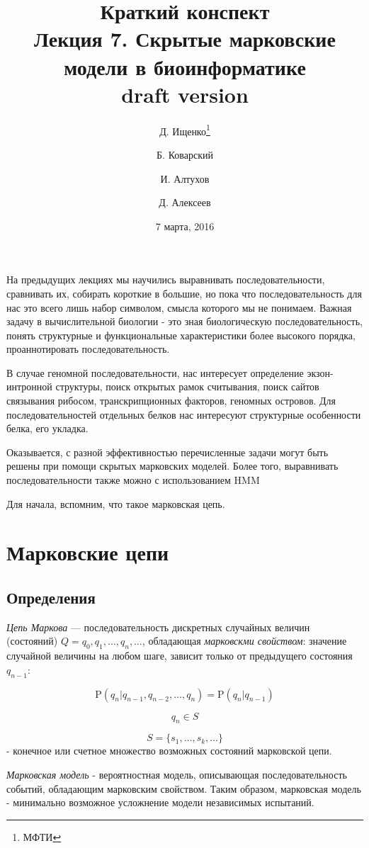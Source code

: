 \documentclass[letterpaper, 11pt]{article}
\title{\large{Краткий конспект}\\
\LARGE{Лекция 7. Скрытые марковские модели в биоинформатике}\\
draft version}
\date{7 марта, 2016}
\author{Д. Ищенко\thanks{МФТИ} \and Б. Коварский\footnotemark[1]
\and И. Алтухов\footnotemark[1] \and Д. Алексеев\footnotemark[1]}
\newcommand{\prob}{\mathrm{P}}
\begin{document}
\maketitle
\thispagestyle{empty}
\clearpage


На предыдущих лекциях мы научились выравнивать последовательности, сравнивать их, собирать короткие в большие, но пока что последовательность для нас это всего лишь набор символом, смысла которого мы не понимаем.
Важная задачу в вычислительной биологии - это зная биологическую последовательность, понять структурные и функциональные характеристики более высокого порядка, проаннотировать последовательность.

В случае геномной последовательности, нас интересует определение экзон-интронной структуры, поиск открытых рамок считывания, поиск 	сайтов связывания рибосом, транскрипционных факторов, геномных островов. Для последовательностей отдельных белков нас интересуют структурные особенности белка, его укладка.

Оказывается, с разной эффективностью перечисленные задачи могут быть решены при помощи скрытых марковских моделей. Более того, выравнивать последовательности также можно с использованием HMM

Для начала, вспомним, что такое марковская цепь.

\section{Марковские цепи}
\subsection{Определения}

\textit{Цепь Маркова} — последовательность дискретных случайных величин (состояний) $Q=q_0,q_1,\ldots,q_n,\ldots$, обладающая \textit{марковскми свойством}: значение случайной величины на любом шаге, зависит только от предыдущего состояния $q_{n-1}$:

$$\prob(q_{n}|q_{n-1},q_{n-2},\ldots,q_{n})=\prob(q_{n}|q_{n-1})$$

$$q_{n}\in S$$

$$S=\{s_1,\ldots,s_k,\ldots\}$$ - конечное или счетное множество возможных состояний марковской цепи.


\textit{Марковская модель} - вероятностная модель, описывающая последовательность событий, обладающим марковским свойством.
Таким образом, марковская модель - минимально возможное усложнение модели независимых испытаний.
\end{document}
